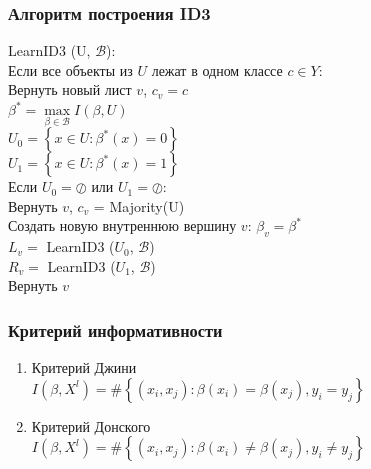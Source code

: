\documentclass[12pt]{beamer}
\begin{document}
\begin{frame}\frametitle{Алгоритм построения ID3}
LearnID3 (U, $\mathcal{B}$):\\
\hspace{10mm} Если все объекты из $U$ лежат в одном классе $c \in Y$: \\
\hspace{20mm} Вернуть новый лист $v$, $c_v = c$\\
\vspace{3mm}
\hspace{10mm} $\beta^* = \max\limits_{\beta \in \mathcal{B}} I(\beta, U)$\\
\vspace{3mm}
\hspace{10mm} $U_0 = \left\{ x \in U : \beta^*(x) = 0\right\}$	\\
\hspace{10mm} $U_1 = \left\{ x \in U : \beta^*(x) = 1\right\}$	\\
\vspace{3mm}
\hspace{10mm} Если $U_0 = \oslash$ или $U_1 = \oslash$:\\ 
\hspace{20mm} Вернуть $v$, $c_v$ = Majority(U)\\
\vspace{3mm}
\hspace{10mm} Создать новую внутреннюю вершину $v$: $\beta_v = \beta^*$\\
\vspace{3mm}
\hspace{10mm} $L_v =$ LearnID3 ($U_0$, $\mathcal{B}$)\\
\hspace{10mm} $R_v =$ LearnID3 ($U_1$, $\mathcal{B}$)\\
\hspace{10mm} Вернуть $v$
\end{frame}

\begin{frame}\frametitle{Критерий информативности}
\begin{enumerate}[--]
\item Критерий Джини\\
$I(\beta,X^l)= \# \left\{ (x_i, x_j): \beta(x_i) = \beta(x_j), y_i = y_j \right\}$
\item Критерий Донского\\
$I(\beta,X^l)= \# \left\{ (x_i, x_j): \beta(x_i) \neq \beta(x_j), y_i \neq y_j \right\}$
\end{enumerate}
\end{frame}
\end{document}
